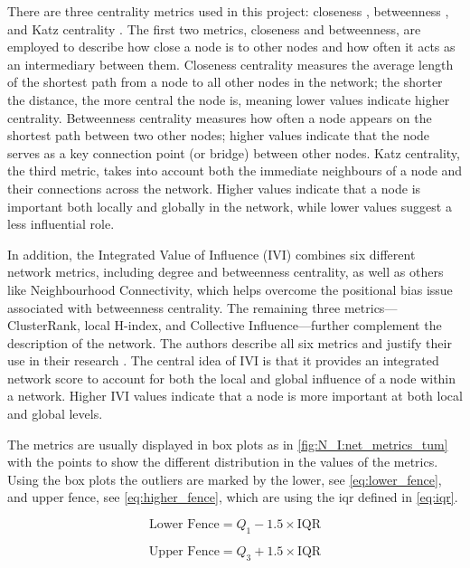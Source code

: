 There are three centrality metrics used in this project: closeness \citep{Opsahl2010-ok}, betweenness \citep{Freeman1977-qe}, and Katz centrality \citep{Katz1953-ie}. The first two metrics, closeness and betweenness, are employed to describe how close a node is to other nodes and how often it acts as an intermediary between them. Closeness centrality measures the average length of the shortest path from a node to all other nodes in the network; the shorter the distance, the more central the node is, meaning lower values indicate higher centrality. Betweenness centrality measures how often a node appears on the shortest path between two other nodes; higher values indicate that the node serves as a key connection point (or bridge) between other nodes. Katz centrality, the third metric, takes into account both the immediate neighbours of a node and their connections across the network. Higher values indicate that a node is important both locally and globally in the network, while lower values suggest a less influential role.

 
In addition, the Integrated Value of Influence (IVI) \cite{Salavaty2020-wo} combines six different network metrics, including degree and betweenness centrality, as well as others like Neighbourhood Connectivity, which helps overcome the positional bias issue associated with betweenness centrality. The remaining three metrics—ClusterRank, local H-index, and Collective Influence—further complement the description of the network. The authors describe all six metrics and justify their use in their research \citet{Salavaty2020-wo}. The central idea of IVI is that it provides an integrated network score to account for both the local and global influence of a node within a network. Higher IVI values indicate that a node is more important at both local and global levels.


The metrics are usually displayed in box plots as in \cref{fig:N_I:net_metrics_tum} with the points to show the different distribution in the values of the metrics. Using the box plots the outliers are marked by the lower, see \cref{eq:lower_fence},  and upper fence, see \cref{eq:higher_fence}, which are using the \acrfull{iqr} defined in \cref{eq:iqr}.

\begin{equation} \label{eq:lower_fence}
  \text{Lower Fence} = Q_1 - 1.5 \times \text{IQR}
\end{equation}

\begin{equation} \label{eq:higher_fence}
  \text{Upper Fence} = Q_3 + 1.5 \times \text{IQR}
\end{equation}

